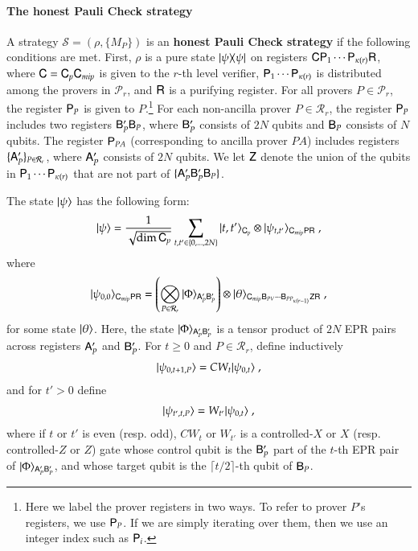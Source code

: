 \paragraph{The honest Pauli Check strategy}
A strategy $\mathcal{S} = (\rho,\{ M_P \})$ is an \textbf{honest Pauli Check strategy} if the following conditions are met. First, $\rho$ is a pure state $|\psi\rangle\! \langle \psi|$ on registers ${\mathsf{C}} {\mathsf{P}}_1 \cdots {\mathsf{P}}_{\kappa(r)} {\mathsf{R}}$, where ${\mathsf{C}} = {\mathsf{C}}_p {\mathsf{C}}_{mip}$ is given to the $r$-th level verifier, ${\mathsf{P}}_1 \cdots {\mathsf{P}}_{\kappa(r)}$ is distributed among the provers in $\mathcal{P}_r$, and ${\mathsf{R}}$ is a purifying register. For all provers $P \in \mathcal{P}_r$, the register ${\mathsf{P}}_P$ is given to $P$.\footnote{Here we label the prover registers in two ways. To refer to prover $P$'s registers, we use ${\mathsf{P}}_P$. If we are simply iterating over them, then we use an integer index such as ${\mathsf{P}}_i$.}  For each non-ancilla prover $P \in \mathcal{R}_r$, the register ${\mathsf{P}}_P$ includes two registers ${\mathsf{B}}'_P {\mathsf{B}}_P$, where ${\mathsf{B}}'_P$ consists of $2N$ qubits and ${\mathsf{B}}_P$ consists of $N$ qubits. The register ${\mathsf{P}}_{PA}$ (corresponding to ancilla prover $PA$) includes registers $\{ {\mathsf{A}}_P' \}_{P \in \mathcal{R}_r}$, where ${\mathsf{A}}_P'$ consists of $2N$ qubits. We let ${\mathsf{Z}}$ denote the union of the qubits in ${\mathsf{P}}_1 \cdots {\mathsf{P}}_{\kappa(r)}$ that are not part of $\{ {\mathsf{A}}_P' {\mathsf{B}}_P' {\mathsf{B}}_P \}$. 

The state $|\psi\rangle$ has the following form:
\begin{equation}
	\ket{\psi} = \frac{1}{\sqrt{\dim \sC_p}} \sum_{ t,t' \in \set{0,\ldots,2N} } \ket{t,t'}_{\sC_p} \otimes \ket{\psi_{t,t'}}_{\sC_{mip} \sP \sR}\;,
	\label{eq:honest-psi}
\end{equation}
where 
\[
	|\psi_{0,0}\rangle_{{\mathsf{C}}_{mip} {\mathsf{P}} {\mathsf{R}}} = \left( \bigotimes_{P \in \mathcal{R}_r} |\Phi\rangle_{{\mathsf{A}}_P' {\mathsf{B}}_P'}\right) \otimes |\theta\rangle_{{\mathsf{C}}_{mip} {\mathsf{B}}_{PV} \cdots {\mathsf{B}}_{PP_{\kappa(r-1)}} {\mathsf{Z}} {\mathsf{R}}}\;,
\]
for some state $|\theta\rangle$. Here, the state $|\Phi\rangle_{{\mathsf{A}}_P' {\mathsf{B}}_P'}$ is a tensor product of $2N$ EPR pairs across registers ${\mathsf{A}}_P'$ and ${\mathsf{B}}_P'$. For $t\geq 0$ and 
$P \in \mathcal{R}_r$, define inductively
\begin{align}
	|\psi_{0,t+1,P}\rangle =  CW_t |\psi_{0,t}\rangle \;,
\end{align}
and for $t' > 0$ define 
\begin{align}
	|\psi_{t',t,P}\rangle =  W_{t'} |\psi_{0,t}\rangle \;,
\end{align}
where if $t$ or $t'$ is even (resp. odd), $CW_t$ or $W_{t'}$ is a controlled-$X$ or $X$ (resp. controlled-$Z$ or $Z$) gate whose control qubit is the ${\mathsf{B}}_P'$ part of the $t$-th EPR pair of $|\Phi\rangle_{{\mathsf{A}}_P' {\mathsf{B}}_P'}$, and whose target qubit is the $\lceil t/2\rceil$-th qubit of ${\mathsf{B}}_P$. 

